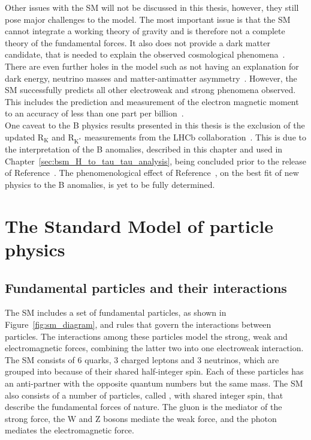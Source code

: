 Other issues with the \ac{SM} will not be discussed in this thesis, however, they still pose major challenges to the model.
The most important issue is that the \ac{SM} cannot integrate a working theory of gravity and is therefore not a complete theory of the fundamental forces.
It also does not provide a dark matter candidate, that is needed to explain the observed cosmological phenomena~\cite{Clowe:2003tk,WMAP:2008lyn,Planck:2015fie}.
There are even further holes in the model such as not having an explanation for dark energy, neutrino masses and matter-antimatter asymmetry~\cite{ParticleDataGroup:2022pth}. 
However, the \ac{SM} successfully predicts all other electroweak and strong phenomena observed.
This includes the prediction and measurement of the electron magnetic moment to an accuracy of less than one part per billion~\cite{Fan:2022eto}.\\

One caveat to the B physics results presented in this thesis is the exclusion of the updated $\text{R}_{\text{K}}$ and $\text{R}_{\text{K}^{*}}$ measurements from the LHCb collaboration~\cite{LHCb:2022zom}.
This is due to the interpretation of the B anomalies, described in this chapter and used in Chapter~\ref{sec:bsm_H_to_tau_tau_analysis}, being concluded prior to the release of Reference~\cite{LHCb:2022zom}.
The phenomenological effect of Reference~\cite{LHCb:2022zom}, on the best fit of new physics to the B anomalies, is yet to be fully determined.

\section{The Standard Model of particle physics}

\subsection{Fundamental particles and their interactions}

The \ac{SM} includes a set of fundamental particles, as shown in Figure~\ref{fig:sm_diagram}, and rules that govern the interactions between particles.
The interactions among these particles model the strong, weak and electromagnetic forces, combining the latter two into one electroweak interaction.
The \ac{SM} consists of 6 quarks, 3 charged leptons and 3 neutrinos, which are grouped into  because of their shared half-integer spin. 
Each of these particles has an anti-partner with the opposite quantum numbers but the same mass.
The \ac{SM} also consists of a number of particles, called , with shared integer spin, that describe the fundamental forces of nature. 
The gluon is the mediator of the strong force, the W and Z bosons mediate the weak force, and the photon mediates the electromagnetic force. \\

